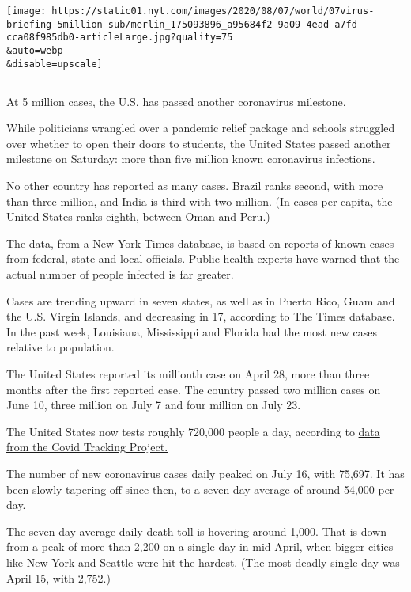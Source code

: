 \texttt{[image: https://static01.nyt.com/images/2020/08/07/world/07virus-briefing-5million-sub/merlin\_175093896\_a95684f2-9a09-4ead-a7fd-cca08f985db0-articleLarge.jpg?quality=75\\\&auto=webp\\\&disable=upscale]}

\hypertarget{section}{%
\subsection{}\label{section}}

At 5 million cases, the U.S. has passed another coronavirus milestone.

While politicians wrangled over a pandemic relief package and schools
struggled over whether to open their doors to students, the United
States passed another milestone on Saturday: more than five million
known coronavirus infections.

No other country has reported as many cases. Brazil ranks second, with
more than three million, and India is third with two million. (In cases
per capita, the United States ranks eighth, between Oman and Peru.)

The data, from
\href{https://www.nytimes.com/interactive/2020/us/coronavirus-us-cases.html}{a
New York Times database}, is based on reports of known cases from
federal, state and local officials. Public health experts have warned
that the actual number of people infected is far greater.

Cases are trending upward in seven states, as well as in Puerto Rico,
Guam and the U.S. Virgin Islands, and decreasing in 17, according to The
Times database. In the past week, Louisiana, Mississippi and Florida had
the most new cases relative to population.

The United States reported its millionth case on April 28, more than
three months after the first reported case. The country passed two
million cases on June 10, three million on July 7 and four million on
July 23.

The United States now tests roughly 720,000 people a day, according to
\href{https://covidtracking.com/data/us-daily}{data from the Covid
Tracking Project.}

The number of new coronavirus cases daily peaked on July 16, with
75,697. It has been slowly tapering off since then, to a seven-day
average of around 54,000 per day.

The seven-day average daily death toll is hovering around 1,000. That is
down from a peak of more than 2,200 on a single day in mid-April, when
bigger cities like New York and Seattle were hit the hardest. (The most
deadly single day was April 15, with 2,752.)


